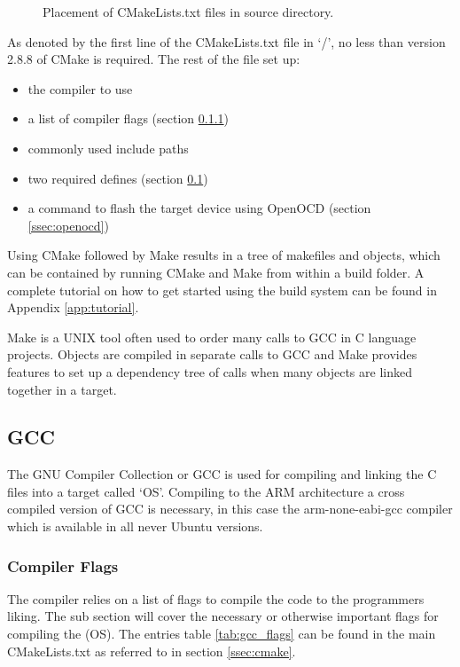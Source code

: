 \begin{figure}[H]
	\caption{Placement of CMakeLists.txt files in source directory.}
	\label{fig:cmake_files}
\end{figure}

As denoted by the first line of the CMakeLists.txt file in `/', no less than version 2.8.8 of CMake is required.
The rest of the file set up:

\begin{itemize}
	\item the compiler to use
	\item a list of compiler flags (section \ref{sssec:compiler_flags})
	\item commonly used include paths
	\item two required defines (section \ref{ssec:gcc})
	\item a command to flash the target device using OpenOCD (section \ref{ssec:openocd})
\end{itemize}

Using CMake followed by Make results in a tree of makefiles and objects,
which can be contained by running CMake and Make from within a build folder.
A complete tutorial on how to get started using the build system can be found in Appendix \ref{app:tutorial}.

Make is a UNIX tool\cite{gnu_make} often used to order many calls to GCC in C language projects.
Objects are compiled in separate calls to GCC and
Make provides features to set up a dependency tree of calls when many objects are linked together in a target.

\subsection{GCC}
\label{ssec:gcc}
The GNU Compiler Collection or GCC is used for compiling and linking the C files into a target called `OS'.
Compiling to the ARM architecture a cross compiled version of GCC is necessary,
in this case the arm-none-eabi-gcc compiler which is available in all never Ubuntu versions\cite{arm_gcc}.

\subsubsection{Compiler Flags}
\label{sssec:compiler_flags}
The compiler relies on a list of flags to compile the code to the programmers liking.
The sub section will cover the necessary or otherwise important flags for compiling the (OS).
The entries table \ref{tab:gcc_flags} can be found in the main CMakeLists.txt as referred to in section \ref{ssec:cmake}.


